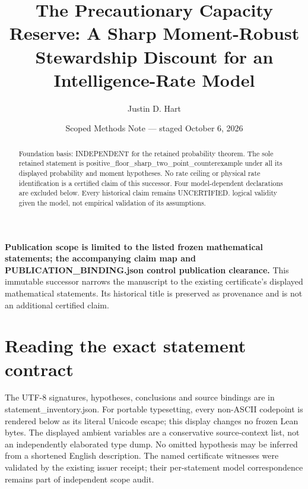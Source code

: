 \documentclass[11pt]{article}
\title{The Precautionary Capacity Reserve: A Sharp Moment-Robust Stewardship Discount for an Intelligence-Rate Model}
\author{Justin D. Hart}
\date{Scoped Methods Note --- staged October 6, 2026}
\begin{document}
\maketitle
\noindent\textbf{Publication scope is limited to the listed frozen mathematical statements; the accompanying claim map and PUBLICATION\_\allowbreak{}BINDING.json control publication clearance.} This immutable successor narrows the manuscript to the existing certificate's displayed mathematical statements. Its historical title is preserved as provenance and is not an additional certified claim.
\begin{abstract}
Foundation basis: INDEPENDENT for the retained probability theorem. The sole retained statement is positive\_floor\_sharp\_two\_point\_counterexample under all its displayed probability and moment hypotheses. No rate ceiling or physical rate identification is a certified claim of this successor. Four model-dependent declarations are excluded below. Every historical claim remains UNCERTIFIED. logical validity given the model, not empirical validation of its assumptions.
\end{abstract}
\section*{Reading the exact statement contract}
The UTF-8 signatures, hypotheses, conclusions and source bindings are in statement\_\allowbreak{}inventory.json. For portable typesetting, every non-ASCII codepoint is rendered below as its literal Unicode escape; this display changes no frozen Lean bytes. The displayed ambient variables are a conservative source-context list, not an independently elaborated type dump. No omitted hypothesis may be inferred from a shortened English description. The named certificate witnesses were validated by the existing issuer receipt; their per-statement model correspondence remains part of independent scope audit.
\end{document}
